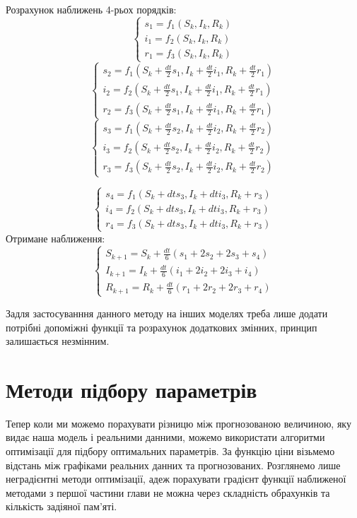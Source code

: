 Розрахунок наближень 4-рьох порядків:
$$
\begin{cases}
    s_1 = f_1(S_k, I_k, R_k) \\
    i_1 = f_2(S_k, I_k, R_k) \\
    r_1 = f_3(S_k, I_k, R_k)
\end{cases}
$$
$$
\begin{cases}
    s_2 = f_1(S_k + \frac{dt}{2} s_1, I_k + \frac{dt}{2} i_1, R_k + 
    \frac{dt}{2} r_1) \\
    i_2 = f_2(S_k + \frac{dt}{2} s_1, I_k + \frac{dt}{2} i_1, R_k + 
    \frac{dt}{2} r_1) \\
    r_2 = f_3(S_k + \frac{dt}{2} s_1, I_k + \frac{dt}{2} i_1, R_k + 
    \frac{dt}{2} r_1) 
\end{cases}$$ $$
\begin{cases}
    s_3 = f_1(S_k + \frac{dt}{2} s_2, I_k + \frac{dt}{2} i_2, R_k + 
    \frac{dt}{2} r_2) \\
    i_3 = f_2(S_k + \frac{dt}{2} s_2, I_k + \frac{dt}{2} i_2, R_k + 
    \frac{dt}{2} r_2) \\
    r_3 = f_3(S_k + \frac{dt}{2} s_2, I_k + \frac{dt}{2} i_2, R_k + 
    \frac{dt}{2} r_2) 
\end{cases}
$$


$$
\begin{cases}
    s_4 = f_1(S_k + dt s_3, I_k + dt i_3, R_k + r_3) \\
    i_4 = f_2(S_k + dt s_3, I_k + dt i_3, R_k + r_3) \\
    r_4 = f_3(S_k + dt s_3, I_k + dt i_3, R_k + r_3) 
\end{cases}$$ 
Отримане наближення:
$$
\begin{cases}
    S_{k + 1} = S_k + \frac{dt}{6} (s_1 + 2s_2 + 2s_3 + s_4)\\
    I_{k + 1} = I_k + \frac{dt}{6} (i_1 + 2i_2 + 2i_3 + i_4)\\
    R_{k + 1} = R_k + \frac{dt}{6} (r_1 + 2r_2 + 2r_3 + r_4)
\end{cases}
$$ 


Задля застосуванння данного методу на інших моделях треба лише 
додати потрібні допоміжні функції та розрахунок додаткових змінних, принцип 
залишається незмінним.


\section{Методи підбору параметрів}


Тепер коли ми можемо порахувати різницю між прогнозованою величиною, 
яку видає наша модель і реальними данними, можемо використати алгоритми 
оптимізації для підбору оптимальних параметрів. За функцію ціни візьмемо 
відстань між графіками реальних данних та прогнозованих. 
Розглянемо лише неградієнтні методи оптимізації, адеж порахувати градієнт 
функції наближеної методами з першої частини глави не можна через 
складність обрахунків та кількість задіяної пам'яті.



